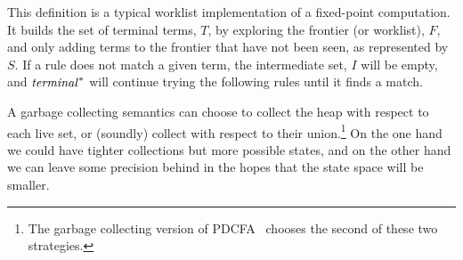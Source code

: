 This definition is a typical worklist implementation of a fixed-point computation.
%
It builds the set of terminal terms, $T$, by exploring the frontier (or worklist), $F$, and only adding terms to the frontier that have not been seen, as represented by $S$.
%
If a rule does not match a given term, the intermediate set, $I$ will be empty, and $\mathit{terminal}^*$ will continue trying the following rules until it finds a match.
%

%
A garbage collecting semantics can choose to collect the heap with respect to each live set, or (soundly) collect with respect to their union.\footnote{The garbage collecting version of PDCFA~\citep{dvanhorn:Earl2012Introspective} chooses the second of these two strategies.}
%
On the one hand we could have tighter collections but more possible states, and on the other hand we can leave some precision behind in the hopes that the state space will be smaller.
%
